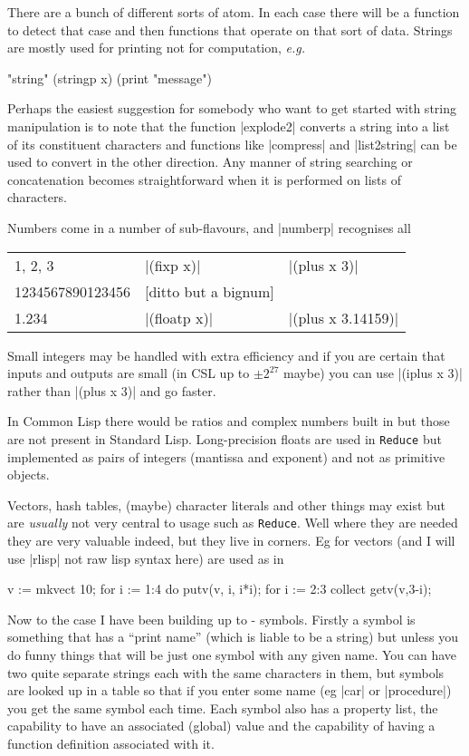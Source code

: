 \documentclass[12pt,twoside,openright]{memoir}
\newcommand{\reduce}{\texttt{Reduce}\xspace}
\begin{document}
There are a bunch of different sorts of atom. In each case there will be a
function to detect that case and then functions that operate on that sort of
data. Strings are mostly used for printing not for computation, \emph{e.g.}
\begin{rlispverb}
  "string" (stringp x) (print "message")
\end{rlispverb}
Perhaps the easiest suggestion for somebody who want to get started
with string manipulation is to note that the function |explode2|
converts a string into a list of its constituent characters and
functions like |compress| and |list2string| can be used to convert in the
other direction. Any manner of string searching or concatenation becomes
straightforward when it is performed on lists of characters.

Numbers come in a number of sub-flavours, and |numberp| recognises all

\begin{tabular}{lll}
   1, 2, 3            &|(fixp x)|      &|(plus x 3)|
   \\
   1234567890123456   &[ditto but a bignum]&
   \\
   1.234              &|(floatp x)|    &|(plus x 3.14159)|
\end{tabular}

Small integers may be handled with extra efficiency and if you are certain that
inputs and outputs are small (in CSL up to $\pm 2^{27}$ maybe) you can use
|(iplus x 3)| rather than |(plus x 3)| and go faster.

In Common Lisp there would be ratios and complex numbers built in but those are
not present in Standard Lisp. Long-precision floats are used in \reduce but
implemented as pairs of integers (mantissa and exponent) and not as primitive
objects.

Vectors, hash tables, (maybe) character literals and other things may exist but
are \emph{usually} not very central to usage such as \reduce. Well where they
are
needed they are very valuable indeed, but they live in corners.
Eg for vectors (and I will use |rlisp| not raw lisp syntax here) are used as in
\begin{rlispverb}
  v := mkvect 10;
  for i := 1:4 do putv(v, i, i*i);
  for i := 2:3 collect getv(v,3-i);
\end{rlispverb}
Now to the case I have been building up to - symbols.  Firstly a symbol is
something that has a ``print name'' (which is liable to be a string) but unless
you do funny things that will be just one symbol with any given name. You can
have two quite separate strings each with the same characters in them, but
symbols are looked up in a table so that if you enter some name (eg |car| or
|procedure|) you get the same symbol each time. Each symbol also has a property
list, the capability to have an associated (global) value and the capability of
having a function definition associated with it.
\end{document}
